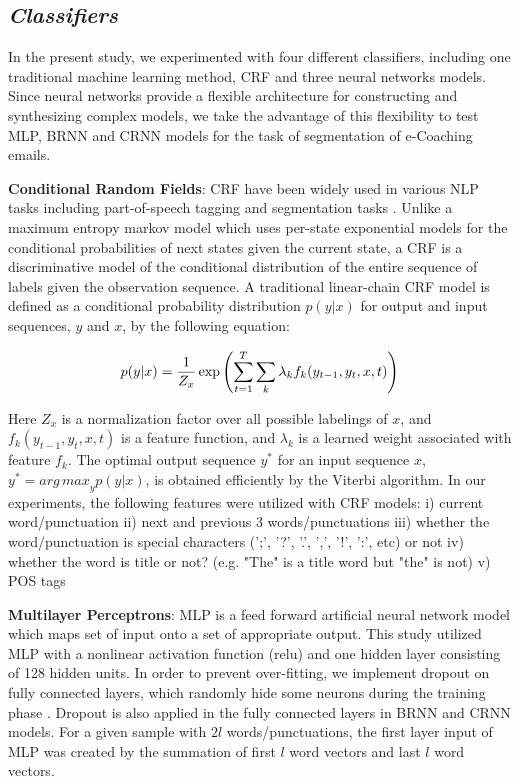 \documentclass{amia}
\begin{document}
\subsection*{\textit{Classifiers}}

In the present study, we experimented with four different classifiers, including one traditional machine learning method, CRF and three neural networks models. Since neural networks provide a flexible architecture for constructing and synthesizing complex models, we take the advantage of this flexibility to test MLP, BRNN and CRNN models for the task of segmentation of e-Coaching emails.

\textbf{Conditional Random Fields}: CRF have been widely used in various NLP tasks including part-of-speech tagging and segmentation tasks \cite{lafferty2001conditional, hirohata2008identifying}. Unlike a maximum entropy markov model which uses per-state exponential models for the conditional probabilities of next states given the current state, a CRF is a discriminative model of the conditional distribution of the entire sequence of labels given the observation sequence. A traditional linear-chain CRF model is defined as a conditional probability distribution $p(y|x)$ for output and input sequences, $y$ and $x$, by the following equation:

\begin{equation}
p(y|x) = \frac{1}{Z_x}\exp{\left(\sum_{t=1}^{T}\sum_{k}^{}\lambda_k f_k(y_{t-1}, y_t, x, t)\right)} \\
\end{equation}

Here $Z_x$ is a normalization factor over all possible labelings of $x$, and $f_k(y_{t-1}, y_t, x, t)$ is a feature function, and $\lambda_k$ is a learned weight associated with feature $f_k$. The optimal output sequence $y^*$ for an input sequence $x$, $y^* = {arg\,max}_y p(y|x)$, is obtained efficiently by the Viterbi algorithm. In our experiments, the following features were utilized with CRF models: i) current word/punctuation ii) next and previous 3 words/punctuations iii) whether the word/punctuation is special characters (';', '?', '.', ',', '!', ':', etc) or not iv) whether the word is title or not? (e.g. "The" is a title word but "the" is not) v) POS tags   

\textbf{Multilayer Perceptrons}: MLP is a feed forward artificial neural network model which maps set of input onto a set of appropriate output. This study utilized MLP with a nonlinear activation function (relu) and one hidden layer consisting of 128 hidden units. In order to prevent over-fitting, we implement dropout on fully connected layers, which randomly hide some neurons during the training phase \cite{srivastava2014dropout}. Dropout is also applied in the fully connected layers in BRNN and CRNN models. For a given sample with $2l$ words/punctuations, the first layer input of MLP was created by the summation of first $l$ word vectors and last $l$ word vectors. 
\end{document}
